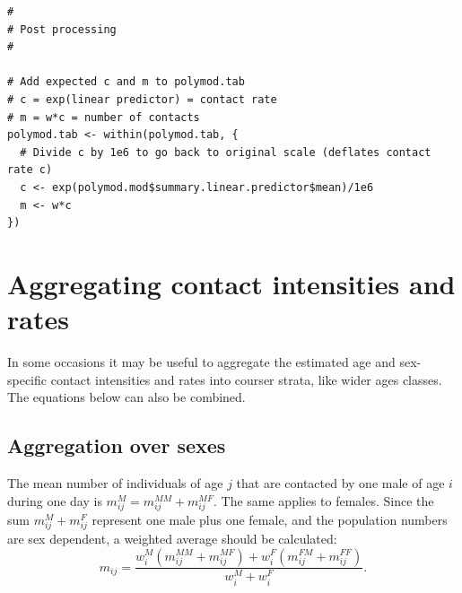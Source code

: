 \documentclass[aoas,preprint]{imsart}
\numberwithin{equation}{section}
\begin{document}
\begin{verbatim}
#
# Post processing
#

# Add expected c and m to polymod.tab
# c = exp(linear predictor) = contact rate
# m = w*c = number of contacts
polymod.tab <- within(polymod.tab, {
  # Divide c by 1e6 to go back to original scale (deflates contact rate c)
  c <- exp(polymod.mod$summary.linear.predictor$mean)/1e6
  m <- w*c
})
\end{verbatim}

\section{Aggregating contact intensities and rates}

In some occasions it may be useful to aggregate the estimated age and sex-specific contact intensities and rates into courser strata, like wider ages classes. The equations below can also be combined.

\subsection{Aggregation over sexes}
The mean number of individuals of age $j$ that are contacted by one male of age $i$ during one day is $m_\mathit{ij}^M = m_\mathit{ij}^\mathit{MM} + m_\mathit{ij}^\mathit{MF}$. The same applies to females. Since the sum $m_\mathit{ij}^M + m_\mathit{ij}^F$ represent one male plus one female, and the population numbers are sex dependent, a weighted average should be calculated:
\begin{equation}
m_\mathit{ij} = \frac{w_i^M (m_\mathit{ij}^\mathit{MM} +m_\mathit{ij}^\mathit{MF}) + w_i^F (m_\mathit{ij}^\mathit{FM}+m_\mathit{ij}^\mathit{FF})}{w_i^M+w_i^F }.
\end{equation}
\end{document}
